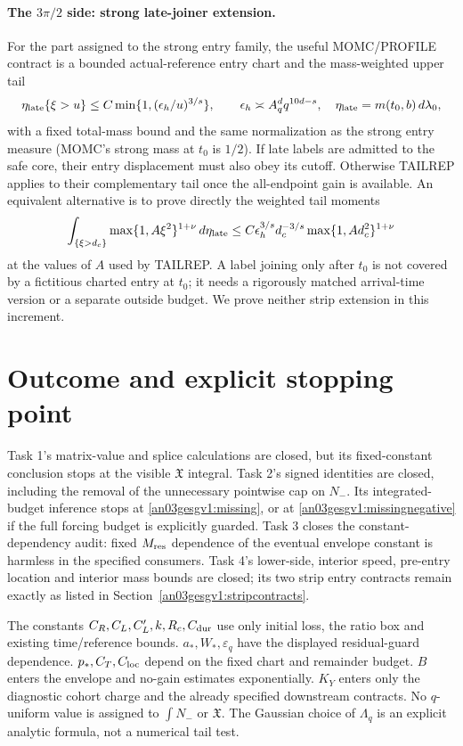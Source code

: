 \documentclass[11pt]{article}
\theoremstyle{remark}\newtheorem{remark}[proposition]{Remark}
\newcommand{\dd}{\,d}
\begin{document}
\paragraph{The $3\pi/2$ side: strong late-joiner extension.}
For the part assigned to the strong entry family, the useful
MOMC/PROFILE contract is a bounded actual-reference entry
chart and the mass-weighted upper tail
\begin{equation}
 \eta_{\rm late}\{\xi>u\}\le C
       \min\{1,(\epsilon_h/u)^{3/s}\},\qquad
 \epsilon_h\asymp A_q^d q^{10d-s},
 \quad \eta_{\rm late}=m(t_0,b)\dd\lambda_0,
 \label{an03gesgv1:latestripcontract}
\end{equation}
with a fixed total-mass bound and the same normalization as
the strong entry measure (MOMC's strong mass at $t_0$ is
$1/2$). If late labels are admitted to the safe core, their
entry displacement must also obey its cutoff. Otherwise
TAILREP applies to their complementary tail once the
all-endpoint gain is available. An equivalent alternative
is to prove directly the weighted tail moments
\[
 \int_{\{\xi>d_c\}}\max\{1,A\xi^2\}^{1+\nu}\dd\eta_{\rm late}
 \le C\epsilon_h^{3/s}d_c^{-3/s}
                  \max\{1,A d_c^2\}^{1+\nu}
\]
at the values of $A$ used by TAILREP. A label joining only
after $t_0$ is not covered by a fictitious charted entry at
$t_0$; it needs a rigorously matched arrival-time version or
a separate outside budget. We prove neither strip extension
in this increment.

\section{Outcome and explicit stopping point}
Task 1's matrix-value and splice calculations are closed,
but its fixed-constant conclusion stops at the visible
$\mathfrak X$ integral. Task 2's signed identities are closed,
including the removal of the unnecessary pointwise cap on
$N_-$. Its integrated-budget inference stops at
\eqref{an03gesgv1:missing}, or at
\eqref{an03gesgv1:missingnegative} if the full forcing budget
is explicitly guarded. Task 3 closes the constant-dependency
audit: fixed $M_{\rm res}$ dependence of the eventual envelope
constant is harmless in the specified consumers. Task 4's
lower-side, interior speed, pre-entry location and interior
mass bounds are closed; its two strip entry contracts remain
exactly as listed in Section~\ref{an03gesgv1:stripcontracts}.

The constants $C_R,C_L,C_L',k,R_c,C_{\rm dur}$ use only
initial loss, the ratio box and existing time/reference bounds.
$a_*,W_*,\varepsilon_q$ have the displayed residual-guard
dependence. $p_*,C_T,C_{\rm loc}$ depend on the fixed chart
and remainder budget. $B$ enters the envelope and no-gain
estimates exponentially. $K_Y$ enters only the diagnostic
cohort charge and the already specified downstream contracts.
No $q$-uniform value is assigned to $\int N_-$ or
$\mathfrak X$. The Gaussian choice of $\Lambda_q$ is an
explicit analytic formula, not a numerical tail test.
\end{document}
